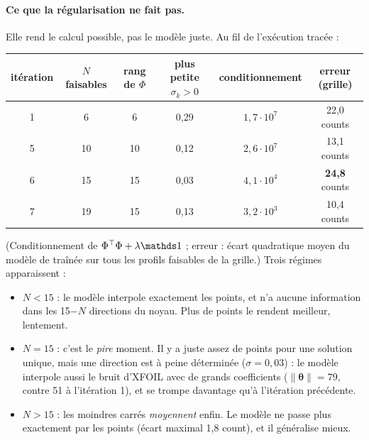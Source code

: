\paragraph{Ce que la régularisation ne fait pas.} Elle rend le calcul possible, pas le modèle juste. Au fil de l'exécution tracée :
\begin{center}
\renewcommand{\arraystretch}{1.2}
\small
\begin{tabular}{cccccc}
\toprule
itération & $N$ faisables & rang de $\Phi$ & plus petite $\sigma_k>0$ & conditionnement & erreur (grille) \\
\midrule
1 & 6 & 6 & 0,29 & $1{,}7\cdot10^7$ & 22,0 counts \\
5 & 10 & 10 & 0,12 & $2{,}6\cdot10^7$ & 13,1 counts \\
6 & 15 & 15 & 0,03 & $4{,}1\cdot10^4$ & \textbf{24,8} counts \\
7 & 19 & 15 & 0,13 & $3{,}2\cdot10^3$ & 10,4 counts \\
\bottomrule
\end{tabular}
\end{center}
(Conditionnement de $\Phi^\top\Phi+\lambda\Id$ ; erreur : écart quadratique moyen du modèle de traînée sur tous les profils faisables de la grille.) Trois régimes apparaissent :
\begin{itemize}
\item \textbf{$N<15$} : le modèle interpole exactement les points, et n'a aucune information dans les 15$-N$ directions du noyau. Plus de points le rendent meilleur, lentement.
\item \textbf{$N=15$} : c'est le \emph{pire} moment. Il y a juste assez de points pour une solution unique, mais une direction est à peine déterminée ($\sigma=0{,}03$) : le modèle interpole aussi le bruit d'XFOIL avec de grands coefficients ($\|\boldsymbol\theta\|=79$, contre 51 à l'itération 1), et se trompe davantage qu'à l'itération précédente.
\item \textbf{$N>15$} : les moindres carrés \emph{moyennent} enfin. Le modèle ne passe plus exactement par les points (écart maximal 1,8 count), et il généralise mieux.
\end{itemize}

